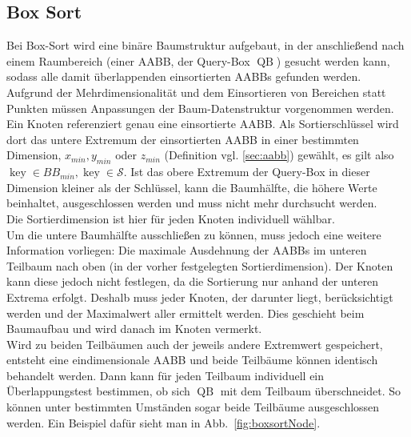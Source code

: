 \subsection{Box Sort}
\label{sec:boxsort}
Bei Box-Sort \cite{houthuys1987box} wird eine binäre Baumstruktur aufgebaut, in der anschließend nach einem Raumbereich (einer AABB, der Query-Box
\newcommand{\qb}{\operatorname{QB}}
 $\qb$) gesucht werden kann, sodass alle damit überlappenden einsortierten AABBs gefunden werden. Aufgrund der Mehrdimensionalität und dem Einsortieren von Bereichen statt Punkten müssen Anpassungen der Baum-Datenstruktur vorgenommen werden.\\
Ein Knoten referenziert genau eine einsortierte AABB. Als Sortierschlüssel wird dort das untere Extremum der einsortierten AABB in einer bestimmten Dimension, $x_{min},y_{min}$ oder $z_{min}$  (Definition vgl. \ref{sec:aabb}) gewählt, es gilt also $\operatorname{key} \in BB_{min}, \operatorname{key} \in \mathcal{S} $. 
Ist das obere Extremum der Query-Box in dieser Dimension kleiner als der Schlüssel, kann die Baumhälfte, die höhere Werte beinhaltet, ausgeschlossen werden und muss nicht mehr durchsucht werden. \\
Die Sortierdimension ist hier für jeden Knoten individuell wählbar.\\
Um die untere Baumhälfte ausschließen zu können, muss jedoch eine weitere Information vorliegen: Die maximale Ausdehnung der AABBs im unteren Teilbaum nach oben (in der vorher festgelegten Sortierdimension). Der Knoten kann diese jedoch nicht festlegen, da die Sortierung nur anhand der unteren Extrema erfolgt. Deshalb muss jeder Knoten, der darunter liegt, berücksichtigt werden und der Maximalwert aller ermittelt werden. Dies geschieht beim Baumaufbau und wird danach im Knoten vermerkt.\\
Wird zu beiden Teilbäumen auch der jeweils andere Extremwert gespeichert, entsteht eine eindimensionale AABB und beide Teilbäume können identisch behandelt werden. Dann kann für jeden Teilbaum individuell ein Überlappungstest bestimmen, ob sich $\qb$ mit dem Teilbaum überschneidet. So können unter bestimmten Umständen sogar beide Teilbäume ausgeschlossen werden. Ein Beispiel dafür sieht man in Abb.~\ref{fig:boxsortNode}.\\

